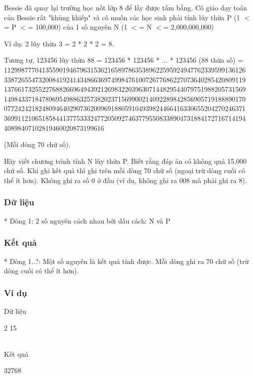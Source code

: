 



   Bessie đã quay lại trường học nốt lớp 8 để lấy được tấm bằng. Cô giáo dạy toán của Bessie rất "khủng khiếp" và cô muốn các học sinh phải tính lũy thừa P (1 $<$= P $<$= 100,000) của 1 số nguyên N (1 $<$= N $<$= 2,000,000,000)  

   Ví dụ: 2 lũy thừa 3 = 2 * 2 * 2 = 8.  

   Tương tự, 123456 lũy thừa 88 = 123456 * 123456 * ... * 123456 (88  thừa số) =  1129987770413559019467963153621658978635389622595924947762339599136126 3387265547320084192414348663697499847610072677686227073640285420809119 1376617325522768826696494392126983220396307144829544079751988205731569 1498433718478969549886325738202371569900214092289842856905719188890170 0772424218248094640290736200969188059104939824466416330655204270246371 3699112106518584413775333247720509274637795508338904731884172716714194 40898407102819460020873199616  

   (Mỗi dòng 70 chữ số).  

   Hãy viết chương trình tính N lũy thừa P. Biết rằng đáp án có không quá 15,000 chữ số. Khi ghi kết quả thì ghi trên mỗi dòng 70 chữ số (ngoại trừ dòng cuối có thể ít hơn). Không ghi ra số 0 ở đầu (ví dụ, không ghi ra  008 mà phải ghi ra 8).  

\subsubsection{   Dữ liệu  }

   * Dòng 1: 2 số nguyên cách nhau bởi dấu cách: N và P  

\subsubsection{   Kết quả  }

   * Dòng 1..?: Một số nguyên là kết quả tính được.  Mỗi dòng ghi ra 70 chữ số (trừ dòng cuối có thể ít hơn).  

\subsubsection{   Ví dụ  }

   Dữ liệu  

   2 15  


\\



   Kết quả  

   32768  
